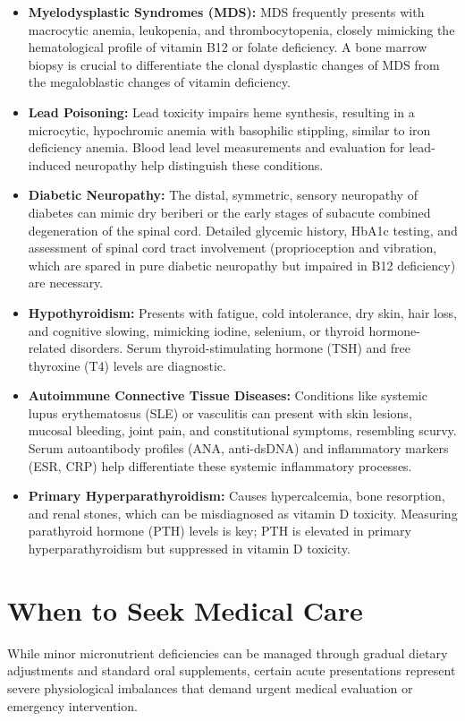 \begin{itemize}
    \item \textbf{Myelodysplastic Syndromes (MDS):} MDS frequently presents with macrocytic anemia, leukopenia, and thrombocytopenia, closely mimicking the hematological profile of vitamin B12 or folate deficiency. A bone marrow biopsy is crucial to differentiate the clonal dysplastic changes of MDS from the megaloblastic changes of vitamin deficiency.
    \item \textbf{Lead Poisoning:} Lead toxicity impairs heme synthesis, resulting in a microcytic, hypochromic anemia with basophilic stippling, similar to iron deficiency anemia. Blood lead level measurements and evaluation for lead-induced neuropathy help distinguish these conditions.
    \item \textbf{Diabetic Neuropathy:} The distal, symmetric, sensory neuropathy of diabetes can mimic dry beriberi or the early stages of subacute combined degeneration of the spinal cord. Detailed glycemic history, HbA1c testing, and assessment of spinal cord tract involvement (proprioception and vibration, which are spared in pure diabetic neuropathy but impaired in B12 deficiency) are necessary.
    \item \textbf{Hypothyroidism:} Presents with fatigue, cold intolerance, dry skin, hair loss, and cognitive slowing, mimicking iodine, selenium, or thyroid hormone-related disorders. Serum thyroid-stimulating hormone (TSH) and free thyroxine (T4) levels are diagnostic.
    \item \textbf{Autoimmune Connective Tissue Diseases:} Conditions like systemic lupus erythematosus (SLE) or vasculitis can present with skin lesions, mucosal bleeding, joint pain, and constitutional symptoms, resembling scurvy. Serum autoantibody profiles (ANA, anti-dsDNA) and inflammatory markers (ESR, CRP) help differentiate these systemic inflammatory processes.
    \item \textbf{Primary Hyperparathyroidism:} Causes hypercalcemia, bone resorption, and renal stones, which can be misdiagnosed as vitamin D toxicity. Measuring parathyroid hormone (PTH) levels is key; PTH is elevated in primary hyperparathyroidism but suppressed in vitamin D toxicity.
\end{itemize}

\section*{When to Seek Medical Care}
While minor micronutrient deficiencies can be managed through gradual dietary adjustments and standard oral supplements, certain acute presentations represent severe physiological imbalances that demand urgent medical evaluation or emergency intervention.


